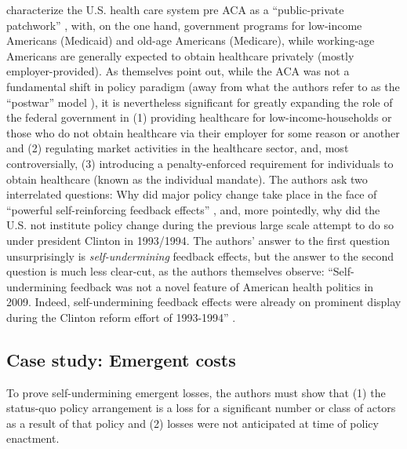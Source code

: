 \documentclass[11pt]{article}
\begin{document}
\textcite[][]{Jacobs2014} characterize the U.S. health care system pre ACA as a \enquote{public-private patchwork} , with, on the one hand, government programs for low-income Americans (Medicaid) and old-age Americans (Medicare), while working-age Americans are generally expected to obtain healthcare privately (mostly employer-provided). As \textcite[][]{Jacobs2014} themselves point out, while the ACA was not a fundamental shift in policy paradigm (away from what the authors refer to as the \enquote{postwar} model ), it is nevertheless significant for greatly expanding the role of the federal government in (1) providing healthcare for low-income-households or those who do not obtain healthcare via their employer for some reason or another and (2) regulating market activities in the healthcare sector, and, most controversially, (3) introducing a penalty-enforced requirement for individuals to obtain healthcare (known as the individual mandate). The authors ask two interrelated questions: Why did major policy change take place in the face of \enquote{powerful self-reinforcing feedback effects} \parencite[][p. 451]{Jacobs2014}, and, more pointedly, why did the U.S. not institute policy change during the previous large scale attempt to do so under president Clinton in 1993/1994. The authors' answer to the first question unsurprisingly is \textit{self-undermining} feedback effects, but the answer to the second question is much less clear-cut, as the authors themselves observe: \enquote{Self-undermining feedback was not a novel feature of American health politics in 2009. Indeed, self-undermining feedback effects were already on prominent display during the Clinton reform effort of 1993-1994} \parencite[][p. 451]{Jacobs2014}.

\subsection*{Case study: Emergent costs}

To prove self-undermining emergent losses, the authors must show that (1) the status-quo policy arrangement is a loss for a significant number or class of actors as a result of that policy and (2) losses were not anticipated at time of policy enactment.

%   
\end{document}
